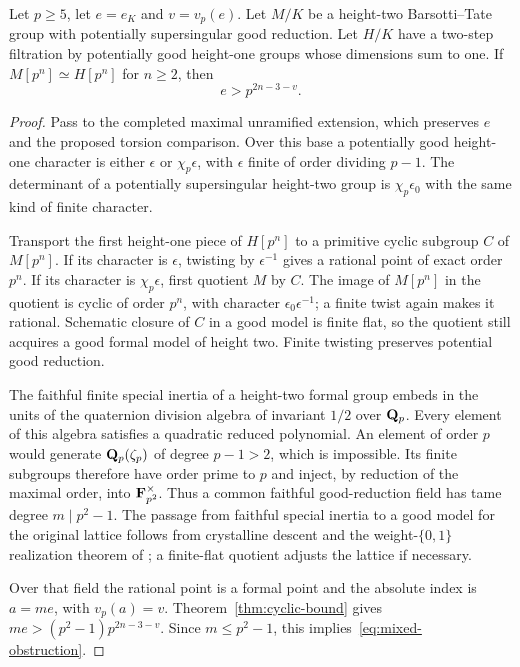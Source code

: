 \begin{proposition}\label{prop:mixed-obstruction}
Let $p\ge5$, let $e=e_K$ and $v=v_p(e)$. Let $M/K$ be a height-two Barsotti--Tate group with potentially supersingular good reduction. Let $H/K$ have a two-step filtration by potentially good height-one groups whose dimensions sum to one. If
$M[p^n]\simeq H[p^n]$ for $n\ge2$, then
\begin{equation}\label{eq:mixed-obstruction}
 e>p^{2n-3-v}.
\end{equation}
\end{proposition}

\begin{proof}
Pass to the completed maximal unramified extension, which preserves $e$ and the proposed torsion comparison. Over this base a potentially good height-one character is either $\epsilon$ or $\chi_p\epsilon$, with $\epsilon$ finite of order dividing $p-1$. The determinant of a potentially supersingular height-two group is $\chi_p\epsilon_0$ with the same kind of finite character.

Transport the first height-one piece of $H[p^n]$ to a primitive cyclic subgroup $C$ of $M[p^n]$. If its character is $\epsilon$, twisting by $\epsilon^{-1}$ gives a rational point of exact order $p^n$. If its character is $\chi_p\epsilon$, first quotient $M$ by $C$. The image of $M[p^n]$ in the quotient is cyclic of order $p^n$, with character $\epsilon_0\epsilon^{-1}$; a finite twist again makes it rational. Schematic closure of $C$ in a good model is finite flat, so the quotient still acquires a good formal model of height two. Finite twisting preserves potential good reduction.

The faithful finite special inertia of a height-two formal group embeds in the units of the quaternion division algebra of invariant $1/2$ over $\mathbf Q_p$. Every element of this algebra satisfies a quadratic reduced polynomial. An element of order $p$ would generate $\mathbf Q_p(\zeta_p)$ of degree $p-1>2$, which is impossible. Its finite subgroups therefore have order prime to $p$ and inject, by reduction of the maximal order, into $\mathbf F_{p^2}^\times$. Thus a common faithful good-reduction field has tame degree $m\mid p^2-1$. The passage from faithful special inertia to a good model for the original lattice follows from crystalline descent and the weight-$\{0,1\}$ realization theorem of \citet[Corollary~2.2.6]{Kisin2006}; a finite-flat quotient adjusts the lattice if necessary.

Over that field the rational point is a formal point and the absolute index is $a=me$, with $v_p(a)=v$. Theorem~\ref{thm:cyclic-bound} gives $me>(p^2-1)p^{2n-3-v}$. Since $m\le p^2-1$, this implies~\eqref{eq:mixed-obstruction}.
\end{proof}
